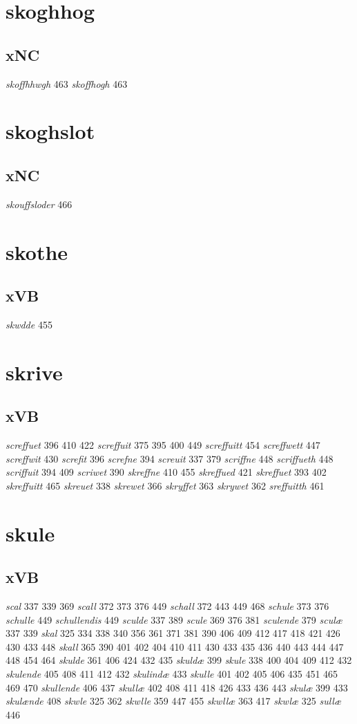\documentclass[a4paper,twocolumn]{article}
\begin{document}
\section{skoghhog}
\label{sec:org014fc12}
\subsection{xNC}
\label{sec:org39f2bc7}
\emph{skoffhhwgh} 463 \emph{skoffhogh} 463 
\section{skoghslot}
\label{sec:org64d1df0}
\subsection{xNC}
\label{sec:orge2b9a2d}
\emph{skouffsloder} 466 
\section{skothe}
\label{sec:org804d637}
\subsection{xVB}
\label{sec:orgfb9d0a0}
\emph{skwdde} 455 
\section{skrive}
\label{sec:org80c4d10}
\subsection{xVB}
\label{sec:org3133694}
\emph{screffuet} 396 410 422 \emph{screffuit} 375 395 400 449 \emph{screffuitt} 454 \emph{screffwett} 447 \emph{screffwit} 430 \emph{screfit} 396 \emph{screfne} 394 \emph{screuit} 337 379 \emph{scriffne} 448 \emph{scriffueth} 448 \emph{scriffuit} 394 409 \emph{scriwet} 390 \emph{skreffne} 410 455 \emph{skreffued} 421 \emph{skreffuet} 393 402 \emph{skreffuitt} 465 \emph{skreuet} 338 \emph{skrewet} 366 \emph{skryffet} 363 \emph{skrywet} 362 \emph{sreffuitth} 461 
\section{skule}
\label{sec:orgb604855}
\subsection{xVB}
\label{sec:orgb8f1a90}
\emph{scal} 337 339 369 \emph{scall} 372 373 376 449 \emph{schall} 372 443 449 468 \emph{schule} 373 376 \emph{schulle} 449 \emph{schullendis} 449 \emph{sculde} 337 389 \emph{scule} 369 376 381 \emph{sculende} 379 \emph{sculæ} 337 339 \emph{skal} 325 334 338 340 356 361 371 381 390 406 409 412 417 418 421 426 430 433 448 \emph{skall} 365 390 401 402 404 410 411 430 433 435 436 440 443 444 447 448 454 464 \emph{skulde} 361 406 424 432 435 \emph{skuldæ} 399 \emph{skule} 338 400 404 409 412 432 \emph{skulende} 405 408 411 412 432 \emph{skulindæ} 433 \emph{skulle} 401 402 405 406 435 451 465 469 470 \emph{skullende} 406 437 \emph{skullæ} 402 408 411 418 426 433 436 443 \emph{skulæ} 399 433 \emph{skulænde} 408 \emph{skwle} 325 362 \emph{skwlle} 359 447 455 \emph{skwllæ} 363 417 \emph{skwlæ} 325 \emph{sullæ} 446 
\end{document}
